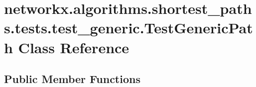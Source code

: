 \hypertarget{classnetworkx_1_1algorithms_1_1shortest__paths_1_1tests_1_1test__generic_1_1TestGenericPath}{}\section{networkx.\+algorithms.\+shortest\+\_\+paths.\+tests.\+test\+\_\+generic.\+Test\+Generic\+Path Class Reference}
\label{classnetworkx_1_1algorithms_1_1shortest__paths_1_1tests_1_1test__generic_1_1TestGenericPath}
\subsection*{Public Member Functions}
